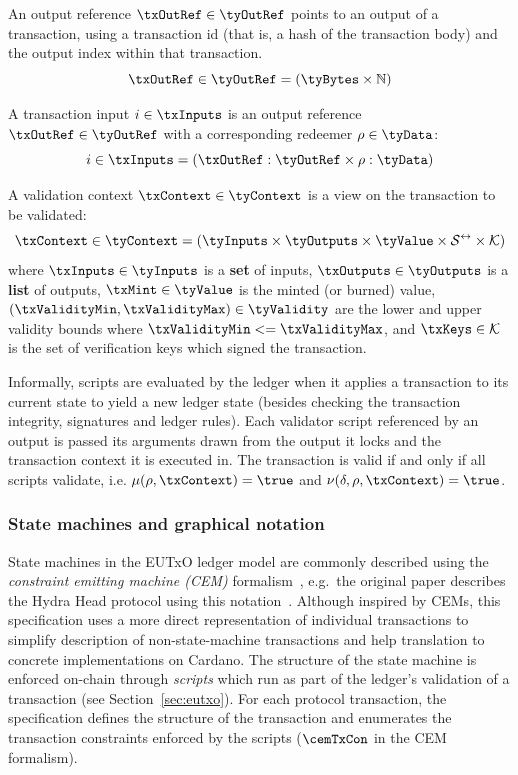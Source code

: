 \begin{definition}
	An output reference $\txOutRef \in \tyOutRef$ points to an output of a
	transaction, using a transaction id (that is, a hash of the transaction body)
	and the output index within that transaction.
	\[
		\txOutRef \in \tyOutRef = (\tyBytes \times \mathbb{N})
	\]
\end{definition}

\begin{definition}[Inputs]
	A transaction input $i \in \txInputs$ is an output reference
	$\txOutRef \in \tyOutRef$ with a corresponding redeemer $\rho \in \tyData$:
	\[
		i \in \txInputs = (\txOutRef : \tyOutRef \times \rho : \tyData)
	\]
\end{definition}

\begin{definition}
	A validation context $\txContext \in \tyContext$ is a view on the transaction
	to be validated:
	\[
		\txContext \in \tyContext = (\tyInputs \times \tyOutputs \times \tyValue \times \mathcal{S}^{\leftrightarrow} \times \mathcal{K})
	\]
	where $\txInputs \in \tyInputs$ is a \textbf{set} of inputs,
	$\txOutputs \in \tyOutputs$ is a \textbf{list} of outputs,
	$\txMint \in \tyValue$ is the minted (or burned) value,
	$(\txValidityMin, \txValidityMax) \in \tyValidity$ are the lower and upper
	validity bounds where $\txValidityMin <= \txValidityMax$, and
	$\txKeys \in \mathcal{K}$ is the set of verification keys which signed the
	transaction.
\end{definition}

Informally, scripts are evaluated by the ledger when it applies a transaction to
its current state to yield a new ledger state (besides checking the transaction
integrity, signatures and ledger rules). Each validator script referenced by
an output is passed its arguments drawn from the output it locks and the
transaction context it is executed in. The transaction is valid if and only if
all scripts validate, i.e. $\mu(\rho, \txContext) = \true$ and
$\nu(\delta, \rho, \txContext) = \true$.

\subsubsection{State machines and graphical notation}

State machines in the EUTxO ledger model are commonly described using the
\emph{constraint emitting machine (CEM)} formalism~\cite{eutxo}, e.g.~the
original paper describes the Hydra Head protocol using this
notation~\cite{hydrahead20}. Although inspired by CEMs, this specification uses
a more direct representation of individual transactions to simplify description
of non-state-machine transactions and help translation to concrete
implementations on Cardano. The structure of the state machine is enforced
on-chain through \emph{scripts} which run as part of the ledger's validation of
a transaction (see Section~\ref{sec:eutxo}). For each protocol transaction, the
specification defines the structure of the transaction and enumerates the
transaction constraints enforced by the scripts ($\cemTxCon$ in the CEM
formalism).

